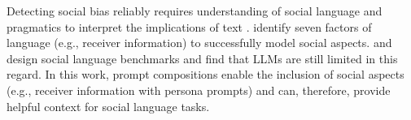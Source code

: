 
Detecting social bias reliably requires understanding of social language and pragmatics to interpret the implications of text \cite{choi2023}. \citet{hovy2021} identify seven factors of language (e.g., receiver information) to successfully model social aspects. \citet{choi2023} and \citet{zhou2023a} design social language benchmarks and find that LLMs are still limited in this regard. In this work, prompt compositions enable the inclusion of social aspects (e.g., receiver information with persona prompts) and can, therefore, provide helpful context for social language tasks.